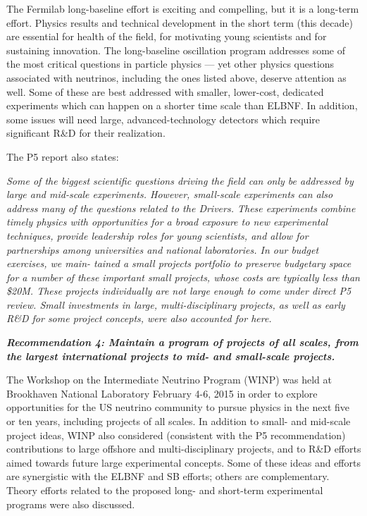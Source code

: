 The Fermilab long-baseline effort is exciting and compelling, but it
is a long-term effort.  Physics results and technical development in
the short term (this decade) are essential for health of the field,
for motivating young scientists and for sustaining innovation.  The
long-baseline oscillation program addresses some of the most critical
questions in particle physics --- yet other physics questions
associated with neutrinos, including the ones listed above, deserve
attention as well.  Some of these are best addressed with smaller,
lower-cost, dedicated experiments which can happen 
on a shorter time scale than ELBNF.  In addition, some issues will
need large, advanced-technology detectors which require
significant R\&D for their realization.

The P5 report also states:

\textit{Some of the biggest scientific questions driving the field can only be
addressed by large and mid-scale experiments. However, small-scale
experiments can also address many of the questions related to the
Drivers. These experiments combine timely physics with opportunities
for a broad exposure to new experimental techniques, provide
leadership roles for young scientists, and allow for partnerships
among universities and national laboratories. In our budget exercises,
we main- tained a small projects portfolio to preserve budgetary space
for a number of these important small projects, whose costs are
typically less than \$20M. These projects individually are not large
enough to come under direct P5 review. Small investments in large,
multi-disciplinary projects, as well as early R\&D for some project
concepts, were also accounted for here.}

\textit{\textbf{Recommendation 4: Maintain a program of projects of all
  scales, from the largest international projects to mid- and
  small-scale projects.}}


The Workshop on the Intermediate Neutrino Program (WINP) was held at
Brookhaven National Laboratory February 4-6, 2015 in order to explore
opportunities for the US neutrino community to pursue physics in the
next five or ten years, including projects of all scales.  In addition
to small- and mid-scale project ideas, WINP also considered
(consistent with the P5 recommendation) contributions to large
offshore and multi-disciplinary projects, and to R\&D efforts aimed
towards future large experimental concepts.  Some of these ideas and
efforts are synergistic with the ELBNF and SB efforts; others are
complementary.  Theory efforts related to the proposed long- and
short-term experimental programs were also discussed.

